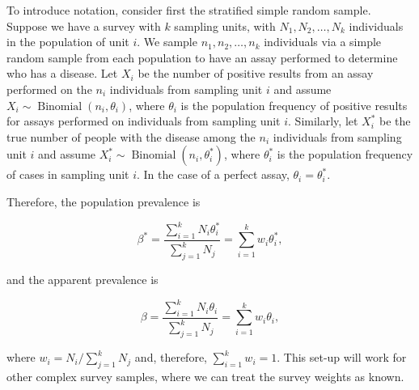 \documentclass[AMA,STIX1COL]{WileyNJD-v2}
\begin{document}
To introduce notation, consider first the stratified simple random sample.
Suppose we have a survey with  \( k \) sampling units, with \( N_1, N_2, \ldots, N_k \) individuals in the population of unit \( i \).
We sample \( n_1, n_2, \ldots, n_k \) individuals via a simple random sample from each population to have an assay performed to determine who has a disease.
Let \( X_i \) be the number of positive results from an assay performed on the \( n_i \) individuals from sampling unit \( i \) and assume \( X_i \sim \operatorname{Binomial}(n_i, \theta_i) \), where \( \theta_i \) is the population frequency of positive results for assays performed on individuals from sampling unit \( i \).
Similarly, let \( X_i^* \) be the true number of people with the disease among the \( n_i \) individuals from sampling unit \( i \) and assume \( X_i^* \sim \operatorname{Binomial}(n_i, \theta_i^*) \), where \( \theta_i^* \) is the population frequency of cases in sampling unit \( i \).
In the case of a perfect assay, \( \theta_i = \theta_i^* \).




Therefore, the population prevalence is 

\begin{equation}
    \beta^* = \frac{\sum_{i=1}^k N_i \theta_i^*}{\sum_{j=1}^k N_j} = \sum_{i=1}^k w_i \theta_i^*,
    \label{eq:pop-prev}
\end{equation}

and the apparent prevalence is 

\begin{equation}
    \beta = \frac{\sum_{i=1}^k N_i \theta_i}{\sum_{j=1}^k N_j} = \sum_{i=1}^k w_i \theta_i,
    \label{eq:app-prev}
\end{equation}

where \( w_i = N_i / \sum_{j=1}^k N_j \) and, therefore, \( \sum_{i=1}^k w_i = 1 \).
This set-up will work for other complex survey samples, where we can treat the survey weights as known.
\end{document}
